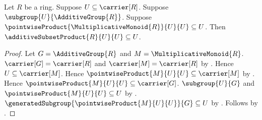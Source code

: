 \begin{corollary}\label{pointwise_square_contraction_implies_additive_square_contraction}
    Let $R$ be a ring.
    Suppose $U\subseteq\carrier[R]$.
    Suppose $\subgroup{U}{\AdditiveGroup{R}}$.
    Suppose
        $\pointwiseProduct{\MultiplicativeMonoid{R}}{U}{U}\subseteq U$.
    Then $\additiveSubsetProduct{R}{U}{U}\subseteq U$.
\end{corollary}
\begin{proof}
    Let $G=\AdditiveGroup{R}$ and $M=\MultiplicativeMonoid{R}$.
    $\carrier[G]=\carrier[R]$ and $\carrier[M]=\carrier[R]$ by
        .
    Hence $U\subseteq\carrier[M]$.
    Hence $\pointwiseProduct{M}{U}{U}\subseteq\carrier[M]$ by
        .
    Hence $\pointwiseProduct{M}{U}{U}\subseteq\carrier[G]$.
    $\subgroup{U}{G}$ and
        $\pointwiseProduct{M}{U}{U}\subseteq U$ by \auto.
    $\generatedSubgroup{\pointwiseProduct{M}{U}{U}}{G}\subseteq U$ by
        .
    Follows by .
\end{proof}
